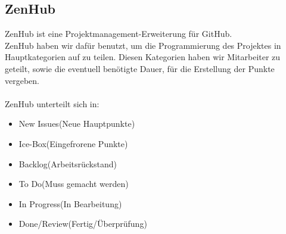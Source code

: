 \subsection{ZenHub}
ZenHub ist eine Projektmanagement-Erweiterung für GitHub.
\\
ZenHub haben wir dafür benutzt, um die Programmierung des Projektes in Hauptkategorien auf zu teilen.
Diesen Kategorien haben wir Mitarbeiter zu geteilt, sowie die eventuell benötigte Dauer, für die Erstellung der Punkte vergeben.
\\\\
ZenHub unterteilt sich in:
\begin{itemize}
	\item New Issues(Neue Hauptpunkte)
	\item Ice-Box(Eingefrorene Punkte)
	\item Backlog(Arbeitsrückstand)
	\item To Do(Muss gemacht werden)
	\item In Progress(In Bearbeitung)
	\item Done/Review(Fertig/Überprüfung) 
\end{itemize}
